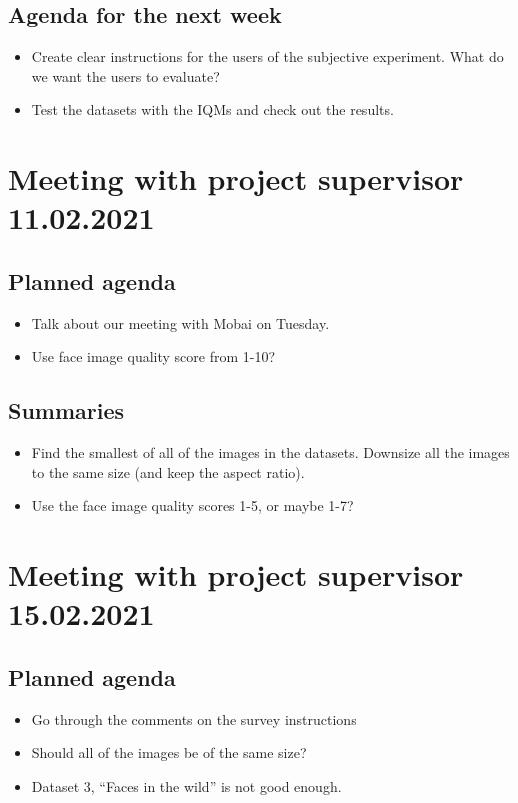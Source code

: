 \subsection*{Agenda for the next week}
\begin{itemize}
    \item Create clear instructions for the users of the subjective experiment. What do we want the users to evaluate? 
    \item Test the datasets with the IQMs and check out the results.
\end{itemize}

\newpage

\section*{Meeting with project supervisor 11.02.2021}
\subsection*{Planned agenda}
\begin{itemize}
    \item Talk about our meeting with Mobai on Tuesday.
    \item Use face image quality score from 1-10?
\end{itemize}

\subsection*{Summaries}
\begin{itemize}
    \item Find the smallest of all of the images in the datasets. Downsize all the images to the same size (and keep the aspect ratio).
    \item Use the  face image quality scores 1-5, or maybe 1-7?
\end{itemize}

\newpage

\section*{Meeting with project supervisor 15.02.2021}
\subsection*{Planned agenda}
\begin{itemize}
    \item Go through the comments on the survey instructions
    \item Should all of the images be of the same size?
    \item Dataset 3, “Faces in the wild” is not good enough.
\end{itemize}

